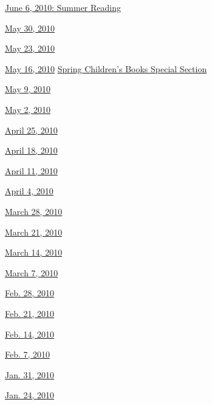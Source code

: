\href{http://www.nytimes.com/indexes/2010/06/05/books/review/index.html}{June
6, 2010: Summer Reading}

\href{http://www.nytimes.com/indexes/2010/05/29/books/review/index.html}{May
30, 2010}

\href{http://www.nytimes.com/indexes/2010/05/22/books/review/index.html}{May
23, 2010}

\href{http://www.nytimes.com/indexes/2010/05/15/books/review/index.html}{May
16, 2010} \textbar{}
\href{http://www.nytimes.com/indexes/2010/05/15/arts/artsspecial/index.html}{Spring
Children's Books Special Section}

\href{http://www.nytimes.com/indexes/2010/05/08/books/review/index.html}{May
9, 2010}

\href{http://www.nytimes.com/indexes/2010/05/01/books/review/index.html}{May
2, 2010}

\href{http://www.nytimes.com/indexes/2010/04/24/books/review/index.html}{April
25, 2010}

\href{http://www.nytimes.com/indexes/2010/04/17/books/review/index.html}{April
18, 2010}

\href{http://www.nytimes.com/indexes/2010/04/10/books/review/index.html}{April
11, 2010}

\href{http://www.nytimes.com/indexes/2010/04/03/books/review/index.html}{April
4, 2010}

\href{http://www.nytimes.com/indexes/2010/03/27/books/review/index.html}{March
28, 2010}

\href{http://www.nytimes.com/indexes/2010/03/20/books/review/index.html}{March
21, 2010}

\href{http://www.nytimes.com/indexes/2010/03/13/books/review/index.html}{March
14, 2010}

\href{http://www.nytimes.com/indexes/2010/03/06/books/review/index.html}{March
7, 2010}

\href{http://www.nytimes.com/indexes/2010/02/27/books/review/index.html}{Feb.
28, 2010}

\href{http://www.nytimes.com/indexes/2010/02/20/books/review/index.html}{Feb.
21, 2010}

\href{http://www.nytimes.com/indexes/2010/02/13/books/review/index.html}{Feb.
14, 2010}

\href{http://www.nytimes.com/indexes/2010/02/06/books/review/index.html}{Feb.
7, 2010}

\href{http://www.nytimes.com/indexes/2010/01/30/books/review/index.html}{Jan.
31, 2010}

\href{http://www.nytimes.com/indexes/2010/01/23/books/review/index.html}{Jan.
24, 2010}

